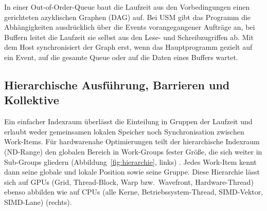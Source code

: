 \documentclass[12pt,a4paper]{article}
\begin{document}
In einer Out-of-Order-Queue baut die Laufzeit aus den Vorbedingungen einen
gerichteten azyklischen Graphen (DAG) auf. Bei USM gibt das Programm die
Abhängigkeiten ausdrücklich über die Events vorangegangener Aufträge an, bei
Buffern leitet die Laufzeit sie selbst aus den Lese- und Schreibzugriffen ab. Mit
dem Host synchronisiert der Graph erst, wenn das Hauptprogramm gezielt auf ein
Event, auf die gesamte Queue oder auf die Daten eines Buffers wartet.

\subsection{Hierarchische Ausführung, Barrieren und Kollektive}\label{sec:k-hierarchie}

Ein einfacher Indexraum überlässt die Einteilung in Gruppen der Laufzeit und
erlaubt weder gemeinsamen lokalen Speicher noch Synchronisation zwischen
Work-Items. Für hardwarenahe Optimierungen teilt der hierarchische Indexraum
(ND-Range) den globalen Bereich in Work-Groups fester Größe, die
sich weiter in Sub-Groups gliedern (Abbildung~\ref{fig:hierarchie},
links) \cite{khronos2020sycl}. Jedes Work-Item kennt dann seine globale und
lokale Position sowie seine Gruppe. Diese Hierarchie lässt sich auf GPUs (Grid,
Thread-Block, Warp bzw.\ Wavefront, Hardware-Thread) ebenso abbilden wie auf CPUs
(alle Kerne, Betriebssystem-Thread, SIMD-Vektor, SIMD-Lane) (rechts).
\end{document}
